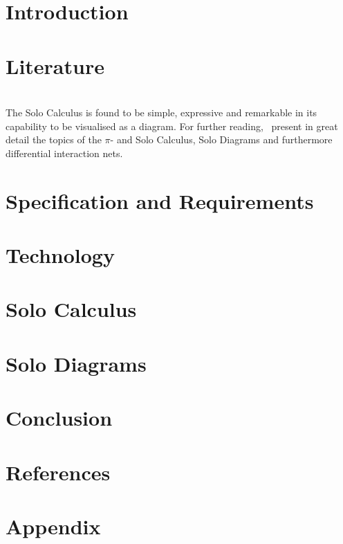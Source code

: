 \documentclass[twoside]{article}
\begin{document}
    \tableofcontents
    \pagebreak


    \section{Introduction}
        

    \section{Literature}
        
        
        
        
        
        
        ~\\ %
        The Solo Calculus is found to be simple, expressive and remarkable in its capability to be visualised as a diagram.
        For further reading,~\cite{acyclic-solos} present in great detail the topics of the $\pi$- and Solo Calculus, Solo Diagrams and furthermore differential interaction nets.

    \section{Specification and Requirements}
        
        

    \section{Technology}

    \section{Solo Calculus}
        
        

    \section{Solo Diagrams}
        
        
        

    \section{Conclusion}

    \section{References}
        

    \section{Appendix}
        
\end{document}
